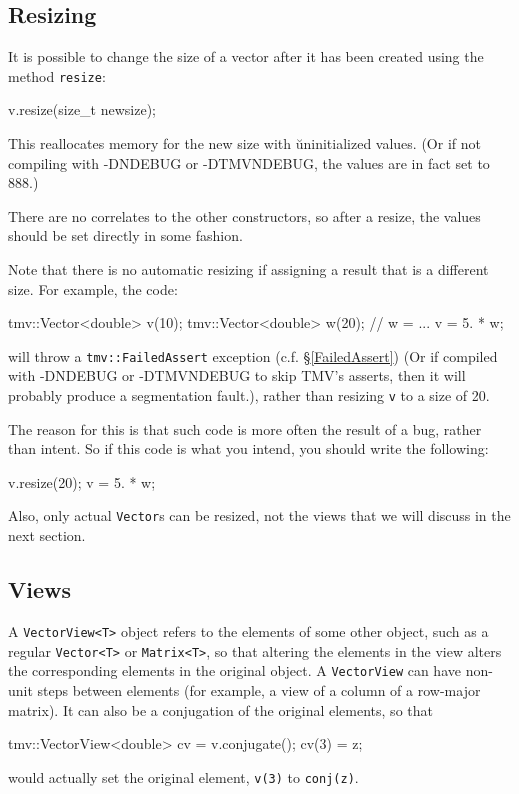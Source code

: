 \documentclass[twoside,letterpaper,11pt]{article}
\renewcommand{\tt}[1]{{\lstinline {#1}}}
\begin{document}
\subsection{Resizing}
\label{Vector_Resize}

It is possible to change the size of a vector after it has been created using the method \tt{resize}:

\begin{tmvcode}
v.resize(size_t newsize);
\end{tmvcode}

This reallocates memory for the new size with {\u uninitialized} values.  
(Or if not compiling with -DNDEBUG or -DTMVNDEBUG,
the values are in fact set to 888.)

There are no correlates to the other constructors, so after a resize, the 
values should be set directly in some fashion.

Note that there is no automatic resizing if assigning a result that is a different size. 
For example, the code:
\begin{tmvcode}
tmv::Vector<double> v(10);
tmv::Vector<double> w(20);
// w = ...
v = 5. * w;
\end{tmvcode}
will throw a \tt{tmv::FailedAssert} exception (c.f. \S\ref{FailedAssert}) (Or if compiled with 
-DNDEBUG or -DTMVNDEBUG to skip TMV's asserts, then it will probably produce a segmentation fault.),
rather than resizing \tt{v} to a size of 20.  

The reason for this is that such code is more often the result of a bug, rather than intent.
So if this code is what you intend, you should write the following:
\begin{tmvcode}
v.resize(20);
v = 5. * w;
\end{tmvcode}

Also, only actual \tt{Vector}s can be resized, not the views that we will discuss in the next section.

\subsection{Views}
\label{Vector_Views}

A \tt{VectorView<T>} object refers to the elements of some other object, such as a regular
\tt{Vector<T>} or \tt{Matrix<T>},
so that altering the elements in the view alters the
corresponding elements in the original object.  A \tt{VectorView}
can have non-unit
steps between elements (for example, a view of a column of a row-major
matrix).  It can also be a conjugation of the original
elements, so that
\begin{tmvcode}
tmv::VectorView<double> cv = v.conjugate();
cv(3) = z;
\end{tmvcode}
would actually set the original element, \tt{v(3)} to \tt{conj(z)}. 
\end{document}
